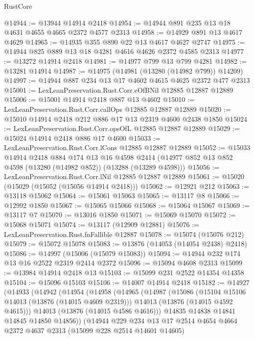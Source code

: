 \begin{lexlean}{RustCore}
\begin{coremodule}
@14944 := @13944 @14914 @2418
@14954 := @14944 @891 @235 @13 @18 @4631 @4655 @4665 @2372 @4577 @2313
@14958 := @14929 @891 @13 @4617 @4629
@14965 := @14935 @355 @890 @22 @13 @4617 @4627 @2747
@14975 := @14944 @825 @889 @13 @18 @4281 @4616 @4626 @2372 @4585 @2313
@14977 := @13272 @14914 @2418
@14981 := @14977 @799 @13 @799 @4281
@14982 := @13281 @14914
@14987 := @14975 (@14981 (@13280 (@14982 @799)) @14209)
@14997 := @14944 @887 @234 @13 @17 @4602 @4615 @4625 @2372 @477 @2313
@15001 := LexLeanPreservation.Rust.Corr.eOfBNil @12885 @12887 @12889
@15006 := @15001 @14914 @2418 @887 @13 @4602
@15010 := LexLeanPreservation.Rust.Corr.callOps @12885 @12887 @12889
@15020 := @15010 @14914 @2418 @212 @886 @17 @13 @2319 @4600 @2438 @1850
@15024 := LexLeanPreservation.Rust.Corr.opsOfL @12885 @12887 @12889
@15029 := @15024 @14914 @2418 @886 @17 @4600
@15033 := LexLeanPreservation.Rust.Corr.lCons @12885 @12887 @12889
@15052 := @15033
    @14914
    @2418
    @884
    @174
    @13
    @16
    @4598
    @2414
    (@14977 @852 @13 @852 @4598 (@13280 (@14982 @852)) (@13288 (@13289 @4598)))
@15056 := LexLeanPreservation.Rust.Corr.lNil @12885 @12887 @12889
@15061 := @15020 (@15029 (@15052 (@15056 @14914 @2418)))
@15062 := @12921 @212
@15063 := @13118 @15062
@15064 := @15061 @15063
@15065 := @13117 @8
@15066 := @12992 @1850
@15067 := @15065 @15066
@15068 := @15064 @15067
@15069 := @13117 @7
@15070 := @13016 @1850
@15071 := @15069 @15070
@15072 := @15068 @15071
@15074 := @13117 (@12909 @12881)
@15076 := LexLeanPreservation.Rust.fnFallible @12887
@15078 := @15074 (@15076 @212)
@15079 := @15072 @15078
@15083 := @13876 (@14053 (@14054 @2438) @2418)
@15086 := @14997 (@15006 (@15079 @15083))
@15094 := @14944 @232 @174 @13 @16 @2522 @2319 @2414 @2372
@15096 := @15094 @4608 @2313
@15099 := @13984 @14914 @2418 @13
@15103 := @15099 @231 @2522 @14354 @14358
@15104 := @15096 @15103
@15106 := @14007 @14914 @2418
@15182 := @14927
    (@14933
      (@14942
        (@14954
          (@14958
            (@14965
              (@14987
                (@15086
                  (@15104 @15106 @14013 (@13876 (@14015 @4609 @2319)))
                  @14013
                  (@13876 (@14015 @4592 @4615)))
                @14013
                (@13876 (@14015 @4586 @4616)))
              @14835
              @14838
              @14841
              @14845
              @14850
              @14856))
          (@14944
            @229
            @234
            @13
            @17
            @2514
            @4654
            @4664
            @2372
            @4637
            @2313
            (@15099 @228 @2514 @14601 @14605)

\end{coremodule}
\end{lexlean}

